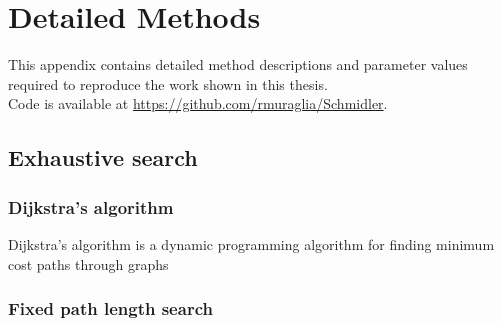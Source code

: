 

\chapter{Detailed Methods}

This appendix contains detailed method descriptions and parameter values required to reproduce the work shown in this thesis. \\
Code is available at \url{https://github.com/rmuraglia/Schmidler}.

\section{Exhaustive search} %
\label{sec:exhaustive_search}

\subsection{Dijkstra's algorithm} %
\label{sub:dijkstra_s_algorithm}

Dijkstra's algorithm is a dynamic programming algorithm for finding minimum cost paths through graphs


\subsection{Fixed path length search} %
\label{sub:fixed_path_length_search}


